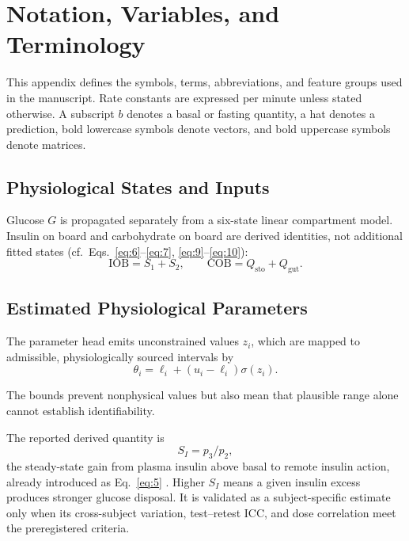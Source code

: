 \documentclass[journal]{IEEEtran}
\begin{document}
\appendices
\section{Notation, Variables, and Terminology}

This appendix defines the symbols, terms, abbreviations, and feature groups used in the manuscript. Rate constants are expressed per minute unless stated otherwise. A subscript $b$ denotes a basal or fasting quantity, a hat denotes a prediction, bold lowercase symbols denote vectors, and bold uppercase symbols denote matrices.

\subsection{Physiological States and Inputs}

Glucose $G$ is propagated separately from a six-state linear compartment model. Insulin on board and carbohydrate on board are derived identities, not additional fitted states (cf.\ Eqs.~\eqref{eq:6}--\eqref{eq:7}, \eqref{eq:9}--\eqref{eq:10}):
\begin{equation}
\text{IOB} = S_1 + S_2, \qquad \text{COB} = Q_{\text{sto}} + Q_{\text{gut}}.
\label{eq:19}
\end{equation}

\subsection{Estimated Physiological Parameters}

The parameter head emits unconstrained values $z_i$, which are mapped to admissible, physiologically sourced intervals \cite{ref33} by
\begin{equation}
\theta_i = \ell_i + (u_i - \ell_i)\sigma(z_i).
\label{eq:20}
\end{equation}

The bounds prevent nonphysical values but also mean that plausible range alone cannot establish identifiability.

The reported derived quantity is
\begin{equation}
S_I = p_3/p_2,
\label{eq:21}
\end{equation}
the steady-state gain from plasma insulin above basal to remote insulin action, already introduced as Eq.~\eqref{eq:5} \cite{ref1,ref32}. Higher $S_I$ means a given insulin excess produces stronger glucose disposal. It is validated as a subject-specific estimate only when its cross-subject variation, test--retest ICC, and dose correlation meet the preregistered criteria.
\end{document}
